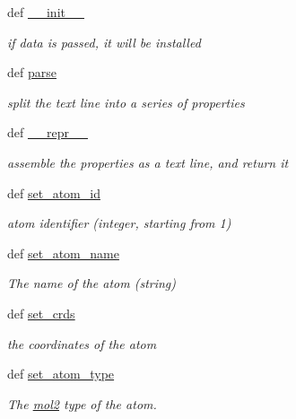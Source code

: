 \begin{DoxyCompactItemize}
\item 
def \hyperlink{classforcebalance_1_1Mol2_1_1mol2__atom_a1d745e4db9ba351cb8e4e53bf544132c}{\-\_\-\-\_\-init\-\_\-\-\_\-}
\begin{DoxyCompactList}\small\item\em if data is passed, it will be installed \end{DoxyCompactList}\item 
def \hyperlink{classforcebalance_1_1Mol2_1_1mol2__atom_a29aaa00b8fa91f4d18cef387622d339d}{parse}
\begin{DoxyCompactList}\small\item\em split the text line into a series of properties \end{DoxyCompactList}\item 
def \hyperlink{classforcebalance_1_1Mol2_1_1mol2__atom_a2e0ecf1c6da8fde8ab146d4341ac1341}{\-\_\-\-\_\-repr\-\_\-\-\_\-}
\begin{DoxyCompactList}\small\item\em assemble the properties as a text line, and return it \end{DoxyCompactList}\item 
def \hyperlink{classforcebalance_1_1Mol2_1_1mol2__atom_a1af054109bd2d27c29e89b5da0f70920}{set\-\_\-atom\-\_\-id}
\begin{DoxyCompactList}\small\item\em atom identifier (integer, starting from 1) \end{DoxyCompactList}\item 
def \hyperlink{classforcebalance_1_1Mol2_1_1mol2__atom_a4d57220ec5b591ad018112d600d4cc8b}{set\-\_\-atom\-\_\-name}
\begin{DoxyCompactList}\small\item\em \-The name of the atom (string) \end{DoxyCompactList}\item 
def \hyperlink{classforcebalance_1_1Mol2_1_1mol2__atom_a3a6c9728119ace119108183920689a9d}{set\-\_\-crds}
\begin{DoxyCompactList}\small\item\em the coordinates of the atom \end{DoxyCompactList}\item 
def \hyperlink{classforcebalance_1_1Mol2_1_1mol2__atom_a233ebfedcde7e5d75b0ec54f194d2b4f}{set\-\_\-atom\-\_\-type}
\begin{DoxyCompactList}\small\item\em \-The \hyperlink{classforcebalance_1_1Mol2_1_1mol2}{mol2} type of the atom. \end{DoxyCompactList}\item 

\end{DoxyCompactItemize}
